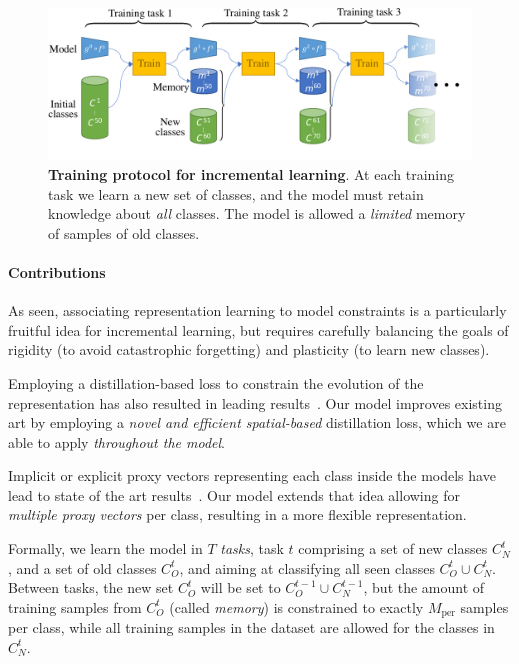 \begin{figure}[tb]
    \begin{center}
        \includegraphics[width=0.8\linewidth]{images/podnet/protocol}
    \end{center}
    \caption{\textbf{Training protocol for incremental learning}. At each training task we learn a
        new set of classes, and the model must retain knowledge about \textit{all} classes. The model is
        allowed a \textit{limited} memory of samples of old classes.}
    \label{fig:protocol}
\end{figure}

\paragraph{Contributions} As seen, associating representation learning to model constraints is a
particularly fruitful idea for incremental learning, but requires carefully balancing the goals of
rigidity (to avoid catastrophic forgetting) and plasticity (to learn new classes).

Employing a distillation-based loss to constrain the evolution of the representation has also
resulted in leading
results~\citep{hou2019ucir,wu2019bias_correction,peng2019m2kd,dhar2019learning_without_memorizing_gradcam}.
Our model improves existing art by employing a \textit{novel and efficient spatial-based}
distillation loss, which we are able to apply \textit{throughout the model}.

Implicit or explicit proxy vectors representing each class inside the models have lead to state of
the art results~\citep{rebuffi2017icarl,hou2019ucir}. Our model extends that idea allowing for
\textit{multiple proxy vectors} per class, resulting in a more flexible representation.


Formally, we learn the model in $T$ \textit{tasks}, task $t$ comprising a set of new classes
$C^t_N$, and a set of old classes $C^t_O$, and aiming at classifying all seen classes $C^t_O \cup
    C^t_N$. Between tasks, the new set $C^t_O$ will be set to $C^{t-1}_O \cup C^{t-1}_N$, but the amount
of training samples from $C^t_O$ (called \textit{memory}) is constrained to exactly $M_\mathrm{per}$
samples per class, while all training samples in the dataset are allowed for the classes in $C^t_N$.

